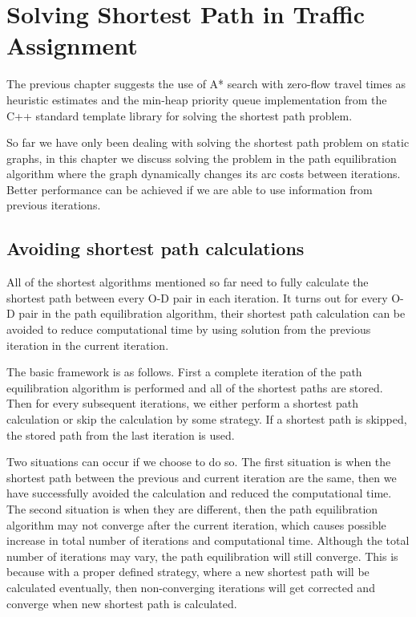 \chapter{Solving Shortest Path in Traffic Assignment} \label{chap:iterative}
The previous chapter suggests the use of A* search with zero-flow travel times as heuristic estimates and the min-heap priority queue implementation from the C++ standard template library for solving the shortest path problem.

So far we have only been dealing with solving the shortest path problem on static graphs,
in this chapter we discuss solving the problem in the path equilibration algorithm where
the graph dynamically changes its arc costs between iterations.
Better performance can be achieved if we are able to use information from previous iterations.

\section{Avoiding shortest path calculations} \label{section:avoid}
All of the shortest algorithms mentioned so far need to fully calculate the shortest path between every O-D pair in each iteration.
It turns out for every O-D pair in the path equilibration algorithm,
their shortest path calculation can be avoided to reduce computational time by using solution from the previous iteration in the current iteration.

The basic framework is as follows.
First a complete iteration of the path equilibration algorithm is performed and all of the shortest paths are stored.
Then for every subsequent iterations,
we either perform a shortest path calculation or skip the calculation by some strategy.
If a shortest path is skipped, the stored path from the last iteration is used.

Two situations can occur if we choose to do so.
The first situation is when the shortest path between the previous and current iteration are the same,
then we have successfully avoided the calculation and reduced the computational time.
The second situation is when they are different,
then the path equilibration algorithm may not converge after the current iteration,
which causes possible increase in total number of iterations and computational time.
Although the total number of iterations may vary,
the path equilibration will still converge.
This is because with a proper defined strategy, where a new shortest path will be calculated eventually, then non-converging iterations will get corrected and converge when new shortest path is calculated.

